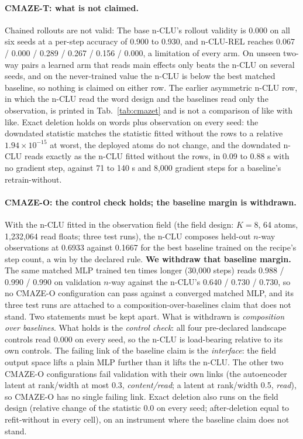 \documentclass{article} %
\newcommand{\sci}[2]{\ensuremath{#1\times10^{#2}}}
\begin{document}
\paragraph{CMAZE-T: what is not claimed.} Chained rollouts are not valid: The base n-CLU's rollout validity
is 0.000 on all six seeds at a per-step accuracy of 0.900 to 0.930, and n-CLU-REL reaches 0.067 /
0.000 / 0.289 / 0.267 / 0.156 / 0.000, a limitation of every arm. On unseen two-way pairs a learned
arm that reads main effects only beats the n-CLU on several seeds, and on the never-trained value the
n-CLU is below the best matched baseline, so nothing is claimed on either row. The earlier asymmetric
n-CLU row, in which the n-CLU read the word design and the baselines read only the observation, is
printed in Tab.~\ref{tab:cmazet} and is not a comparison of like with like. Exact deletion holds on
words plus observation on every seed: the downdated statistic matches the statistic fitted without
the rows to a relative \sci{1.94}{-15} at worst, the deployed atoms do not change, and the downdated
n-CLU reads exactly as the n-CLU fitted without the rows, in 0.09 to 0.88 s with no gradient step,
against 71 to 140 s and 8,000 gradient steps for a baseline's retrain-without.

\paragraph{CMAZE-O: the control check holds; the baseline margin is withdrawn.} With the n-CLU fitted in
the observation field (the field design: $K=8$, 64 atoms, 1,232,064 read floats; three test runs), the n-CLU
composes held-out $n$-way observations at 0.6933 against 0.1667 for the best baseline trained on the
recipe's step count, a win by the declared rule. \textbf{We withdraw that baseline
margin.} The same matched MLP trained ten times longer (30,000 steps) reads 0.988 / 0.990 / 0.990 on
validation $n$-way against the n-CLU's 0.640 / 0.730 / 0.730, so no CMAZE-O configuration can pass
against a converged matched MLP, and its three test runs are attached to a composition-over-baselines claim that
does not stand. Two statements must be kept apart. What is withdrawn is \emph{composition over
baselines}. What holds is the \emph{control check}: all four pre-declared landscape controls read 0.000 on every seed,
so the n-CLU is load-bearing relative to its own controls. The failing link of the baseline claim is
the \emph{interface}: the field output space lifts a plain MLP further than it lifts the n-CLU. The
other two CMAZE-O configurations fail validation with their own links (the autoencoder latent at
rank/width at most 0.3, \emph{content/read}; a latent at rank/width 0.5, \emph{read}), so CMAZE-O has
no single failing link. Exact deletion also runs on the field design (relative change of the statistic 0.0 on
every seed; after-deletion equal to refit-without in every cell), on an instrument where the baseline
claim does not stand.
\end{document}
